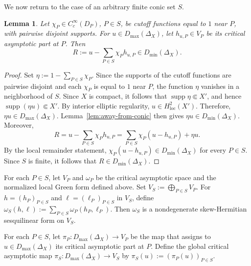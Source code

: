 \documentclass[12pt]{amsart}
\theoremstyle{plain}
\newtheorem{lem}[thm]{Lemma}
\theoremstyle{definition}
\theoremstyle{remark}
\numberwithin{equation}{section} \numberwithin{figure}{section}
\renewcommand*{\to}{\rightarrow}
\begin{document}
We now return to the case of an arbitrary finite conic set \(S\).


\begin{lem}\label{lem:global-remainder}
Let \(\chi_P\in C_c^\infty(D_P)\), \(P\in S\), be cutoff
functions equal to \(1\) near \(P\), with pairwise disjoint supports.
For \(u\in D_{\max}(\Delta_X)\), let \(h_{u,P}\in V_P\) be its
critical asymptotic part at \(P\). Then
\[
R
:=
u-\sum_{P\in S}\chi_P h_{u,P}
\in D_{\min}(\Delta_X).
\]
\end{lem}

\begin{proof}
Set \(\eta:=1-\sum_{P\in S}\chi_P\). Since the supports of the
cutoff functions are pairwise disjoint and each \(\chi_P\) is equal
to \(1\) near \(P\), the function \(\eta\) vanishes in a neighborhood
of \(S\). Since \(X\) is compact, it follows that
\(\operatorname{supp}\eta\Subset X'\), and hence
\(\operatorname{supp}(\eta u)\Subset X'\).
By interior elliptic regularity,
\(u\in H^2_{\mathrm{loc}}(X')\). Therefore,
\(\eta u\in D_{\max}(\Delta_X)\).
Lemma~\ref{lem:away-from-conic} then gives
\(\eta u\in D_{\min}(\Delta_X)\).
Moreover,
\[
R
=
u-\sum_{P\in S}\chi_P h_{u,P}
=
\sum_{P\in S}\chi_P(u-h_{u,P})+\eta u.
\]
By the local remainder statement,
\(\chi_P(u-h_{u,P})\in D_{\min}(\Delta_X)\) for every \(P\in S\).
Since \(S\) is finite, it follows that
\(R\in D_{\min}(\Delta_X)\).
\end{proof}


For each \(P\in S\), let \(V_P\) and \(\omega_P\) be the critical
asymptotic space and the normalized local Green form defined above.
Set \(V_S:=\bigoplus_{P\in S}V_P\). For
\(h=(h_P)_{P\in S}\) and \(\ell=(\ell_P)_{P\in S}\) in \(V_S\),
define
\(\omega_S(h,\ell):=\sum_{P\in S}\omega_P(h_P,\ell_P)\).
Then \(\omega_S\) is a nondegenerate skew-Hermitian sesquilinear form
on \(V_S\).

For each \(P\in S\), let
\(\pi_P:D_{\max}(\Delta_X)\to V_P\) be the map that assigns to
\(u\in D_{\max}(\Delta_X)\) its critical asymptotic part at \(P\).
Define the global critical asymptotic map
\(\pi_S:D_{\max}(\Delta_X)\to V_S\) by
\(\pi_S(u):=(\pi_P(u))_{P\in S}\).
\end{document}
